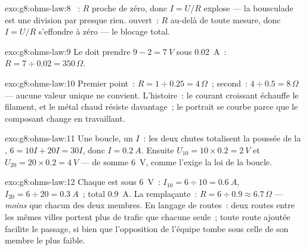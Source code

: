 \begin{solution}{exo:g8:ohms-law:8}
~: $R$ proche de zéro, donc $I = U/R$ explose --- la
bousculade est une division par presque rien.  ouvert~:
$R$ au-delà de toute mesure, donc $I = U/R$ s'effondre à zéro --- le
blocage total.
\end{solution}

\begin{solution}{exo:g8:ohms-law:9}
Le  doit prendre $9 - 2 = \qty{7}{V}$ sous \qty{0.02}{A}~:
$R = 7 \div 0.02 = 350\,\Omega$.
\end{solution}

\begin{solution}{exo:g8:ohms-law:10}
Premier point~: $R = 1 \div 0.25 = 4\,\Omega$~; second~:
$4 \div 0.5 = 8\,\Omega$ --- aucune valeur unique ne convient.
L'histoire~: le courant croissant échauffe le filament, et le métal
chaud résiste davantage~; le portrait se courbe parce que le
composant change en travaillant.
\end{solution}

\begin{solution}{exo:g8:ohms-law:11}
Une boucle, un $I$~: les deux chutes totalisent la poussée de la
, $6 = 10 I + 20 I = 30 I$, donc $I = \qty{0.2}{A}$. Ensuite
$U_{10} = 10 \times 0.2 = \qty{2}{V}$ et
$U_{20} = 20 \times 0.2 = \qty{4}{V}$ --- de somme \qty{6}{V}, comme
l'exige la loi de la boucle.
\end{solution}

\begin{solution}{exo:g8:ohms-law:12}
Chaque  est sous \qty{6}{V}~: $I_{10} = 6 \div 10 =
\qty{0.6}{A}$, $I_{20} = 6 \div 20 = \qty{0.3}{A}$~; total
\qty{0.9}{A}. La remplaçante~: $R = 6 \div 0.9 \approx 6.7\,\Omega$
--- \emph{moins} que chacun des deux membres. En langage de routes~:
deux routes entre les mêmes villes portent plus de trafic que
chacune seule~; toute route ajoutée  facilite le
passage, si bien que l'opposition de l'équipe tombe sous celle de son
membre le plus faible.
\end{solution}

